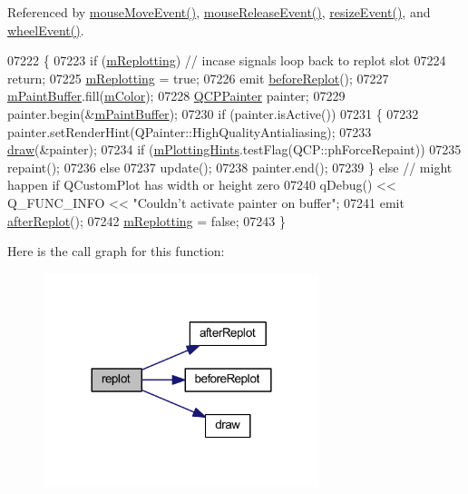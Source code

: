Referenced by \hyperlink{a00115_source_l07639}{mouse\+Move\+Event()}, \hyperlink{a00115_source_l07691}{mouse\+Release\+Event()}, \hyperlink{a00115_source_l07525}{resize\+Event()}, and \hyperlink{a00115_source_l07811}{wheel\+Event()}.


\begin{DoxyCode}
07222 \{
07223   \textcolor{keywordflow}{if} (\hyperlink{a00116_a38ce5778fc22072b64b7ccc05963c684}{mReplotting}) \textcolor{comment}{// incase signals loop back to replot slot}
07224     \textcolor{keywordflow}{return};
07225   \hyperlink{a00116_a38ce5778fc22072b64b7ccc05963c684}{mReplotting} = \textcolor{keyword}{true};
07226   emit \hyperlink{a00116_a0cd30e29b73efd6afe096e44bc5956f5}{beforeReplot}();
07227   \hyperlink{a00116_a804ea55d1894964076fe02acf11da591}{mPaintBuffer}.fill(\hyperlink{a00116_ac071280171e215ffc7d416118bc28d90}{mColor});
07228   \hyperlink{a00047}{QCPPainter} painter;
07229   painter.begin(&\hyperlink{a00116_a804ea55d1894964076fe02acf11da591}{mPaintBuffer});
07230   \textcolor{keywordflow}{if} (painter.isActive()) 
07231   \{
07232     painter.setRenderHint(QPainter::HighQualityAntialiasing);
07233     \hyperlink{a00116_a2e9b3d14dffa43c79835869d488936c9}{draw}(&painter);
07234     \textcolor{keywordflow}{if} (\hyperlink{a00116_af6de5d56e261af21cf6223179fc58883}{mPlottingHints}.testFlag(QCP::phForceRepaint))
07235       repaint();
07236     \textcolor{keywordflow}{else}
07237       update();
07238     painter.end();
07239   \} \textcolor{keywordflow}{else} \textcolor{comment}{// might happen if QCustomPlot has width or height zero}
07240     qDebug() << Q\_FUNC\_INFO << \textcolor{stringliteral}{"Couldn't activate painter on buffer"};
07241   emit \hyperlink{a00116_a6f4fa624af060bc5919c5f266cf426a0}{afterReplot}();
07242   \hyperlink{a00116_a38ce5778fc22072b64b7ccc05963c684}{mReplotting} = \textcolor{keyword}{false};
07243 \}
\end{DoxyCode}


Here is the call graph for this function\+:
\nopagebreak
\begin{figure}[H]
\begin{center}
\leavevmode
\includegraphics[width=228pt]{d4/d3e/a00116_a563540b54b2a09c8ef092d42e9621f42_cgraph}
\end{center}
\end{figure}




